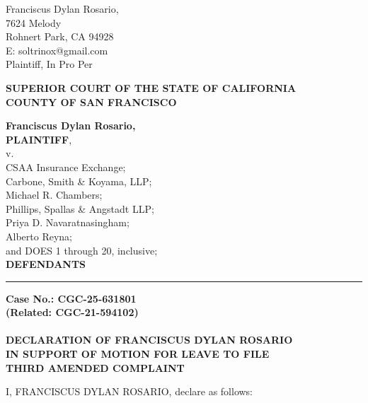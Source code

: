

\nolinenumbers
\begin{singlespace}
Franciscus Dylan Rosario, \\
7624 Melody \\
Rohnert Park, CA 94928 \\
E: soltrinox@gmail.com \\
Plaintiff, In Pro Per \\
\end{singlespace}
\vspace*{9mm}
\begin{tightcenter}
\textbf{SUPERIOR COURT OF THE STATE OF CALIFORNIA} \\
\textbf{COUNTY OF SAN FRANCISCO}
\end{tightcenter}
\vspace*{2.25mm}
\nolinenumbers
\begin{minipage}[t]{3in}
    \raggedright
    \textbf{Franciscus Dylan Rosario,} \\ \textbf{PLAINTIFF}, \\
    \hspace{1cm} v. \\
    \small
    CSAA Insurance Exchange; \\
    Carbone, Smith \& Koyama, LLP; \\
    Michael R. Chambers; \\
    Phillips, Spallas \& Angstadt LLP; \\
    Priya D. Navaratnasingham; \\
    Alberto Reyna; \\
    and DOES 1 through 20, inclusive; \\
    \normalsize
    \textbf{DEFENDANTS}
    \makebox[3in]{\hrulefill}
\end{minipage}%
\hspace{3mm}
\begin{minipage}[t]{0.5pt}
    \vspace{0pt}
    \rule{0.5pt}{3.1in}
\end{minipage}
\hspace{3mm}
\begin{minipage}[t]{3in}
    \raggedright
    \noindent \textbf{Case No.: CGC-25-631801} \\
    \textbf{(Related: CGC-21-594102)} \\
    ~\\
    \textbf{DECLARATION OF FRANCISCUS DYLAN ROSARIO} \\
    \textbf{IN SUPPORT OF MOTION FOR LEAVE TO FILE} \\
    \textbf{THIRD AMENDED COMPLAINT}
\end{minipage}
\vspace*{6mm}
\linenumbers
I, FRANCISCUS DYLAN ROSARIO, declare as follows:

